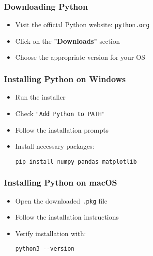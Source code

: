 \documentclass{beamer}
\begin{document}
\begin{frame}
    \frametitle{Downloading Python}
    \begin{itemize}
        \item Visit the official Python website: \texttt{python.org}
        \item Click on the \textbf{"Downloads"} section
        \item Choose the appropriate version for your OS
    \end{itemize}
\end{frame}

\begin{frame}
    \frametitle{Installing Python on Windows}
    \begin{itemize}
        \item Run the installer
        \item Check \texttt{"Add Python to PATH"}
        \item Follow the installation prompts
        \item Install necessary packages:
        \begin{tcolorbox}[colback=lightblue, colframe=darkblue, title=Install Packages]
            \lstinline|pip install numpy pandas matplotlib|
        \end{tcolorbox}
    \end{itemize}
\end{frame}

\begin{frame}
    \frametitle{Installing Python on macOS}
    \begin{itemize}
        \item Open the downloaded \texttt{.pkg} file
        \item Follow the installation instructions
        \item Verify installation with:
        \begin{tcolorbox}[colback=lightblue, colframe=darkblue, title=Verify Installation]
            \lstinline|python3 --version|
        \end{tcolorbox}
    \end{itemize}
\end{frame}
\end{document}
